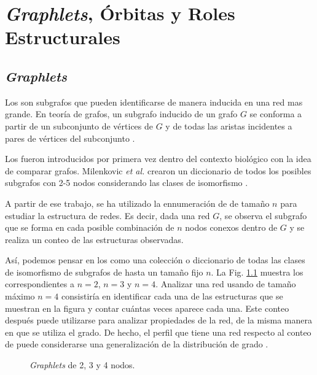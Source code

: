 
\chapter{\textit{Graphlets}, Órbitas y Roles Estructurales}
\label{chapter:3}

\section{\textit{Graphlets}}


Los \graphlets son subgrafos que pueden identificarse de manera inducida en una red mas grande.  En teoría de grafos, un subgrafo inducido de un grafo $G$ se conforma a partir de un subconjunto de vértices de $G$ y de todas las aristas incidentes a pares de vértices del subconjunto \cite{przulj_biological_2007}.

Los \graphlets fueron introducidos por primera vez dentro del contexto biológico con la idea de comparar grafos. Milenkovic \textit{et al.} crearon un diccionario de todos los posibles subgrafos con 2-5 nodos considerando las clases de isomorfismo \cite{milenkovic_uncovering_2008}. 

A partir de ese trabajo, se ha utilizado la ennumeración de \graphlets de tamaño $n$ para estudiar la estructura de redes. Es decir, dada una red $G$, se observa el subgrafo que se forma en cada posible combinación de $n$ nodos conexos dentro de $G$ y se realiza un conteo de las estructuras observadas.

Así, podemos pensar en los \graphlets como una colección o diccionario de todas las clases de isomorfismo de subgrafos de hasta un tamaño fijo $n$. La Fig. \ref{fig:small-graphlets} muestra los \graphlets correspondientes a $n=2$, $n=3$ y $n=4$. Analizar una red usando \graphlets de tamaño máximo $n=4$ consistiría en identificar cada una de las estructuras que se muestran en la figura y contar cuántas veces aparece cada una. Este conteo después puede utilizarse para analizar propiedades de la red, de la misma manera en que se utiliza el grado. De hecho, el perfil que tiene una red respecto al conteo de \graphlets puede considerarse una generalización de la distribución de grado \citep{sarajlic_graphlet-based_2016}. 

 \begin{figure}[htbp]
   \centering
   
    \caption{\textit{Graphlets} de 2, 3 y 4 nodos.}
    \label{fig:small-graphlets}
\end{figure} 


